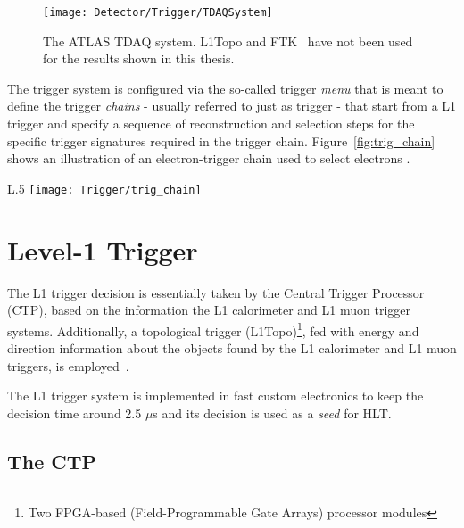 		\begin{figure}[!htb]
			\centering
			\texttt{[image: Detector/Trigger/TDAQSystem]}
			\caption{The ATLAS TDAQ system. L1Topo and FTK~\cite{ATLASTrigger2015} have not been used for the results shown in this thesis.}
			\label{fig:TDAQSyst}
		\end{figure}

		The trigger system is configured via the so-called trigger \textit{menu} that is meant to define the trigger \textit{chains} - usually referred to just as trigger - that start from a L1 trigger and specify a sequence of reconstruction and selection steps for the specific trigger signatures required in the trigger chain. Figure~\ref{fig:trig_chain} shows an illustration of an electron-trigger chain used to select electrons \cite{ATLASTrigger2010}.

		\begin{wrapfigure}{L}{.5\textwidth}
			\centering
			\texttt{[image: Trigger/trig\_chain]}
			\caption{\label{fig:trig_chain} An Electron-trigger chain (from \cite{ATLASTrigger2010}).}
		\end{wrapfigure}
		


		
	\section{Level-1 Trigger}
	\label{sec:L1}

		The L1 trigger decision is essentially taken by the Central Trigger Processor (CTP), based on the information the L1 calorimeter and L1 muon trigger systems. Additionally, a topological trigger (L1Topo)\footnote{Two FPGA-based (Field-Programmable Gate Arrays) processor modules}, fed with energy and direction information about the objects found by the L1 calorimeter and L1 muon triggers, is employed~\cite{ATLASJINST,ATLASTrigger2015,ATLASL1Topo}.

		The L1 trigger system is implemented in fast custom electronics to keep the decision time around 2.5 $\mu$s and its decision is used as a \emph{seed} for HLT. 


		\subsection{The CTP}

